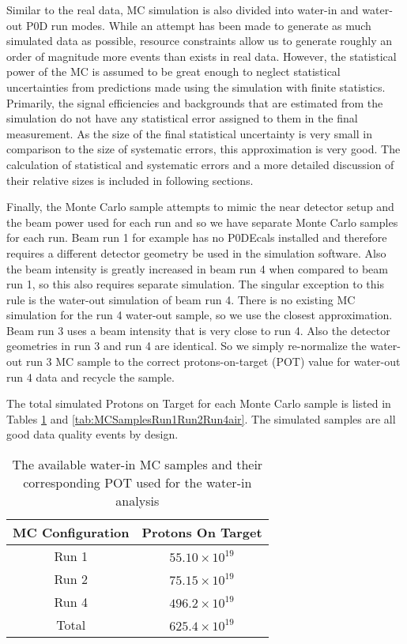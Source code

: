 Similar to the real data, MC simulation is also divided into water-in and water-out P0D run modes. While an attempt has been made to generate as much simulated data as possible, resource constraints allow us to generate roughly an order of magnitude more events than exists in real data. However, the statistical power of the MC is assumed to be great enough to neglect statistical uncertainties from predictions made using the simulation with finite statistics. Primarily, the signal efficiencies and backgrounds that are estimated from the simulation do not have any statistical error assigned to them in the final measurement. As the size of the final statistical uncertainty is very small in comparison to the size of systematic errors, this approximation is very good. The calculation of statistical and systematic errors and a more detailed discussion of their relative sizes is included in following sections.

Finally, the Monte Carlo sample attempts to mimic the near detector setup and the beam power used for each run and so we have separate Monte Carlo samples for each run. Beam run 1 for example has no P0DEcals installed and therefore requires a different detector geometry be used in the simulation software. Also the beam intensity is greatly increased in beam run 4 when compared to beam run 1, so this also requires separate simulation. The singular exception to this rule is the water-out simulation of beam run 4. There is no existing MC simulation for the run 4 water-out sample, so we use the closest approximation. Beam run 3 uses a beam intensity that is very close to run 4. Also the detector geometries in run 3 and run 4 are identical. So we simply re-normalize the water-out run 3 MC sample to the correct protons-on-target (POT) value for water-out run 4 data and recycle the sample. 

The total simulated Protons on Target for each Monte Carlo sample is listed in Tables \ref{tab:MCSamplesRun1Run2Run4water} and \ref{tab:MCSamplesRun1Run2Run4air}. The simulated samples are all good data quality events by design.

\begin{table}[h]
\centering
\caption{The available water-in MC samples and their corresponding 
POT used for the water-in analysis}
\begin{tabular}{cc} \toprule
MC Configuration & Protons On Target \\
\hline
Run 1 & $55.10 \times 10^{19}$ \\ 
Run 2 & $75.15 \times 10^{19}$ \\ 
Run 4 & $496.2 \times 10^{19}$ \\ 
\hline
Total & $625.4 \times 10^{19}$ \\ 
\bottomrule
\end{tabular} 
\label{tab:MCSamplesRun1Run2Run4water} %
\end{table}

